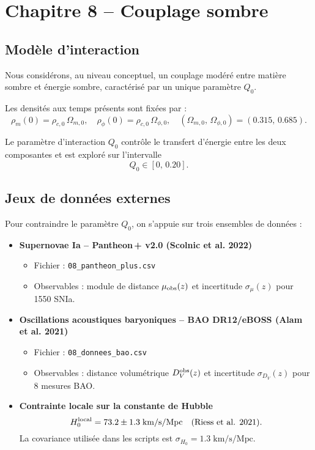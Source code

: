 \section{Chapitre 8 – Couplage sombre}

\subsection{Modèle d’interaction}

Nous considérons, au niveau conceptuel, un couplage modéré entre matière sombre et énergie sombre, caractérisé par un unique paramètre \(Q_{0}\).  

Les densités aux temps présents sont fixées par :
\[
  \rho_{m}(0) = \rho_{c,0}\,\Omega_{m,0},
  \quad
  \rho_{\phi}(0) = \rho_{c,0}\,\Omega_{\phi,0},
  \quad
  (\Omega_{m,0},\,\Omega_{\phi,0}) = (0.315,\,0.685).
\]

Le paramètre d’interaction \(Q_{0}\) contrôle le transfert d’énergie entre les deux composantes et est exploré sur l’intervalle
\[
  Q_{0} \in [0,\,0.20].
\]

\subsection{Jeux de données externes}

Pour contraindre le paramètre \(Q_{0}\), on s’appuie sur trois ensembles de données :

\begin{itemize}
  \item \textbf{Supernovae Ia – Pantheon\,+ v2.0 (Scolnic et al. 2022)}  
    \begin{itemize}
      \item Fichier : \texttt{08\_pantheon\_plus.csv}  
      \item Observables : module de distance \(\mu_{\rm obs}(z)\) et incertitude \(\sigma_{\mu}(z)\) pour 1550 SNIa.  
    \end{itemize}

  \item \textbf{Oscillations acoustiques baryoniques – BAO DR12/eBOSS (Alam et al. 2021)}  
    \begin{itemize}
      \item Fichier : \texttt{08\_donnees\_bao.csv}  
      \item Observables : distance volumétrique \(D_{V}^{\rm obs}(z)\) et incertitude \(\sigma_{D_{V}}(z)\) pour 8 mesures BAO.  
    \end{itemize}

  \item \textbf{Contrainte locale sur la constante de Hubble}  
    \[
      H_{0}^{\rm local} = 73.2 \pm 1.3 \;\mathrm{km/s/Mpc}
      \quad(\text{Riess et al. 2021}).
    \]
    La covariance utilisée dans les scripts est \(\sigma_{H_0}=1.3\;\mathrm{km/s/Mpc}\).
\end{itemize}

